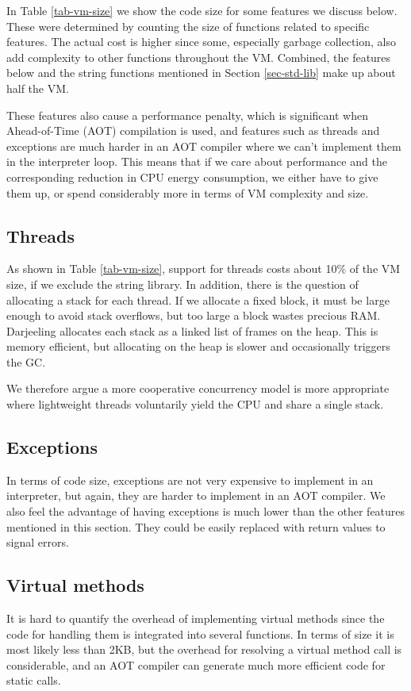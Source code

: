 In Table \ref{tab-vm-size} we show the code size for some features we discuss below. These were determined by counting the size of functions related to specific features. The actual cost is higher since some, especially garbage collection, also add complexity to other functions throughout the VM. Combined, the features below and the string functions mentioned in Section \ref{sec-std-lib} make up about half the VM.

These features also cause a performance penalty, which is significant when Ahead-of-Time (AOT) compilation is used, and features such as threads and exceptions are much harder in an AOT compiler where we can't implement them in the interpreter loop. This means that if we care about performance and the corresponding reduction in CPU energy consumption, we either have to give them up, or spend considerably more in terms of VM complexity and size.


\subsection{Threads}
As shown in Table \ref{tab-vm-size}, support for threads costs about 10\% of the VM size, if we exclude the string library. In addition, there is the question of allocating a stack for each thread. If we allocate a fixed block, it must be large enough to avoid stack overflows, but too large a block wastes precious RAM. Darjeeling allocates each stack as a linked list of frames on the heap. This is memory efficient, but allocating on the heap is slower and occasionally triggers the GC.

We therefore argue a more cooperative concurrency model is more appropriate where lightweight threads voluntarily yield the CPU and share a single stack.


\subsection{Exceptions}
In terms of code size, exceptions are not very expensive to implement in an interpreter, but again, they are harder to implement in an AOT compiler. We also feel the advantage of having exceptions is much lower than the other features mentioned in this section. They could be easily replaced with return values to signal errors.


\subsection{Virtual methods}
It is hard to quantify the overhead of implementing virtual methods since the code for handling them is integrated into several functions. In terms of size it is most likely less than 2KB, but the overhead for resolving a virtual method call is considerable, and an AOT compiler can generate much more efficient code for static calls.


